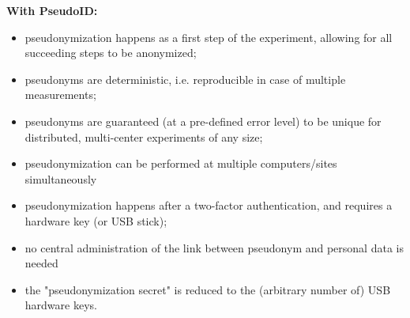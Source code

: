 \textbf{With PseudoID: }
\begin{itemize}
    \item pseudonymization happens as a first step of the experiment, allowing for all succeeding steps to be anonymized;
    \item pseudonyms are deterministic, i.e. reproducible in case of multiple measurements;
    \item pseudonyms are guaranteed (at a pre-defined error level) to be unique for distributed, multi-center experiments of any size;
    \item pseudonymization can be performed at multiple computers/sites simultaneously
    \item pseudonymization happens after a two-factor authentication, and requires a hardware key (or USB stick);
    \item no central administration of the link between pseudonym and personal data is needed
    \item the "pseudonymization secret" is reduced to the (arbitrary number of) USB hardware keys.
\end{itemize}



